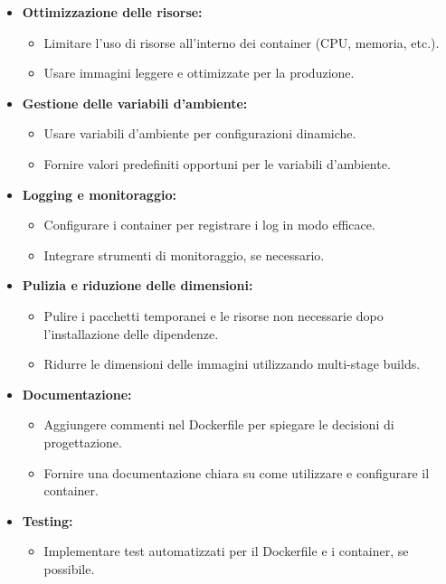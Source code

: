 \documentclass{article}
\begin{document}
\begin{itemize}
\item \textbf{Ottimizzazione delle risorse:}
    \begin{itemize}
        \item Limitare l'uso di risorse all'interno dei container (CPU, memoria, etc.).
        \item Usare immagini leggere e ottimizzate per la produzione.
    \end{itemize}

\item \textbf{Gestione delle variabili d'ambiente:}
    \begin{itemize}
        \item Usare variabili d'ambiente per configurazioni dinamiche.
        \item Fornire valori predefiniti opportuni per le variabili d'ambiente.
    \end{itemize}

\item \textbf{Logging e monitoraggio:}
    \begin{itemize}
        \item Configurare i container per registrare i log in modo efficace.
        \item Integrare strumenti di monitoraggio, se necessario.
    \end{itemize}

\item \textbf{Pulizia e riduzione delle dimensioni:}
    \begin{itemize}
        \item Pulire i pacchetti temporanei e le risorse non necessarie dopo l'installazione delle dipendenze.
        \item Ridurre le dimensioni delle immagini utilizzando multi-stage builds.
    \end{itemize}

\item \textbf{Documentazione:}
    \begin{itemize}
        \item Aggiungere commenti nel Dockerfile per spiegare le decisioni di progettazione.
        \item Fornire una documentazione chiara su come utilizzare e configurare il container.
    \end{itemize}

\item \textbf{Testing:}
    \begin{itemize}
        \item Implementare test automatizzati per il Dockerfile e i container, se possibile.
    \end{itemize}
\end{itemize}
\end{document}
